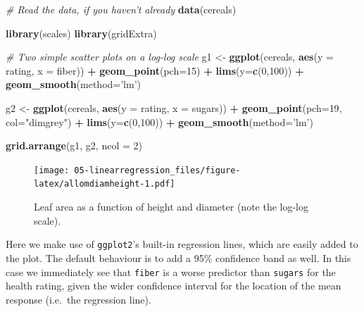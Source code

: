 \documentclass[]{book}
\newenvironment{Shaded}{\begin{snugshade}}{\end{snugshade}}
\newcommand{\CommentTok}[1]{\textcolor[rgb]{0.56,0.35,0.01}{\textit{#1}}}
\newcommand{\DataTypeTok}[1]{\textcolor[rgb]{0.13,0.29,0.53}{#1}}
\newcommand{\DecValTok}[1]{\textcolor[rgb]{0.00,0.00,0.81}{#1}}
\newcommand{\KeywordTok}[1]{\textcolor[rgb]{0.13,0.29,0.53}{\textbf{#1}}}
\newcommand{\NormalTok}[1]{#1}
\newcommand{\OperatorTok}[1]{\textcolor[rgb]{0.81,0.36,0.00}{\textbf{#1}}}
\newcommand{\StringTok}[1]{\textcolor[rgb]{0.31,0.60,0.02}{#1}}
\begin{document}
\begin{Shaded}
\begin{Highlighting}[]
\CommentTok{# Read the data, if you haven't already}
\KeywordTok{data}\NormalTok{(cereals)}

\KeywordTok{library}\NormalTok{(scales)}
\KeywordTok{library}\NormalTok{(gridExtra)}

\CommentTok{# Two simple scatter plots on a log-log scale}
\NormalTok{g1 <-}\StringTok{ }\KeywordTok{ggplot}\NormalTok{(cereals, }\KeywordTok{aes}\NormalTok{(}\DataTypeTok{y =}\NormalTok{ rating, }\DataTypeTok{x =}\NormalTok{ fiber)) }\OperatorTok{+}
\StringTok{  }\KeywordTok{geom_point}\NormalTok{(}\DataTypeTok{pch=}\DecValTok{15}\NormalTok{) }\OperatorTok{+}\StringTok{ }\KeywordTok{lims}\NormalTok{(}\DataTypeTok{y=}\KeywordTok{c}\NormalTok{(}\DecValTok{0}\NormalTok{,}\DecValTok{100}\NormalTok{)) }\OperatorTok{+}
\StringTok{  }\KeywordTok{geom_smooth}\NormalTok{(}\DataTypeTok{method=}\StringTok{'lm'}\NormalTok{)}

\NormalTok{g2 <-}\StringTok{ }\KeywordTok{ggplot}\NormalTok{(cereals, }\KeywordTok{aes}\NormalTok{(}\DataTypeTok{y =}\NormalTok{ rating, }\DataTypeTok{x =}\NormalTok{ sugars)) }\OperatorTok{+}
\StringTok{  }\KeywordTok{geom_point}\NormalTok{(}\DataTypeTok{pch=}\DecValTok{19}\NormalTok{, }\DataTypeTok{col=}\StringTok{"dimgrey"}\NormalTok{) }\OperatorTok{+}\StringTok{ }\KeywordTok{lims}\NormalTok{(}\DataTypeTok{y=}\KeywordTok{c}\NormalTok{(}\DecValTok{0}\NormalTok{,}\DecValTok{100}\NormalTok{)) }\OperatorTok{+}
\StringTok{  }\KeywordTok{geom_smooth}\NormalTok{(}\DataTypeTok{method=}\StringTok{'lm'}\NormalTok{)}

\KeywordTok{grid.arrange}\NormalTok{(g1, g2, }\DataTypeTok{ncol =} \DecValTok{2}\NormalTok{)}
\end{Highlighting}
\end{Shaded}

\begin{figure}
\centering
\texttt{[image: 05-linearregression\_files/figure-latex/allomdiamheight-1.pdf]}
\caption{\label{fig:allomdiamheight}Leaf area as a function of height and diameter (note the log-log scale).}
\end{figure}

Here we make use of \texttt{ggplot2}'s built-in regression lines, which are easily added to the plot. The default behaviour is to add a 95\% confidence band as well. In this case we immediately see that \texttt{fiber} is a worse predictor than \texttt{sugars} for the health rating, given the wider confidence interval for the location of the mean response (i.e.~the regression line).
\end{document}
